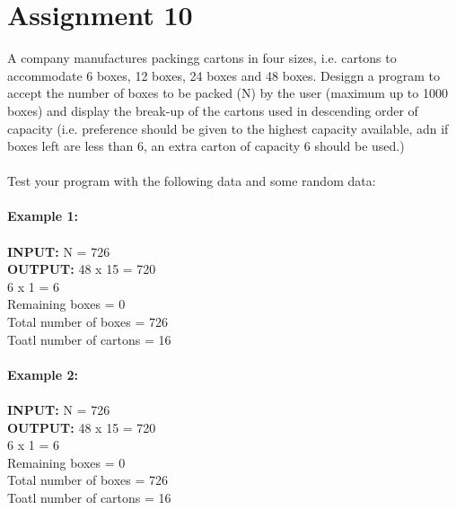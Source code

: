 \section*{\centering Assignment 10}
\vspace{15px}
A company manufactures packingg cartons in four sizes, i.e. cartons to 
accommodate 6 boxes, 12 boxes, 24 boxes and 48 boxes. Desiggn a program to 
accept the number of boxes to be packed (N) by the user (maximum up to 
1000 boxes) and display the break-up of the cartons used in descending order
of capacity (i.e. preference should be given to the highest capacity
available, adn if boxes left are less than 6, an extra carton of capacity
6 should be used.)\\\\
Test your program with the following data and some random data:\\\\
\textbf{Example 1:}\\\\
\textbf{INPUT:}	N = 726\\
\textbf{OUTPUT:}	48 x 15 = 720\\
			6 x 1 = 6\\
	Remaining boxes	= 0\\
	Total number of boxes	= 726\\
	Toatl number of cartons = 16\\\\
\textbf{Example 2:}\\\\
\textbf{INPUT:}	N = 726\\
\textbf{OUTPUT:}	48 x 15 = 720\\
			6 x 1 = 6\\
	Remaining boxes	= 0\\
	Total number of boxes	= 726\\
	Toatl number of cartons = 16\\

